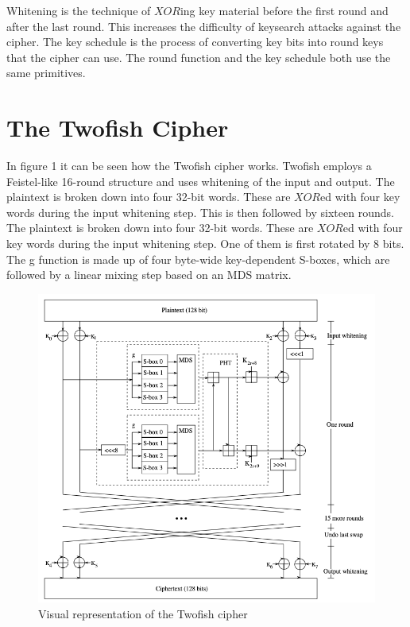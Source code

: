 \documentclass[11pt]{article}
\begin{document}
Whitening is the technique of \(XOR\)ing key material before the first round and after the last round. This increases the
difficulty of keysearch attacks against the cipher. The key schedule is the process of converting key bits into round keys that the cipher can use. The round function and the key schedule both use the same primitives.

\section{The Twofish Cipher}
In figure 1 it can be seen how the Twofish cipher works. Twofish employs a Feistel-like 16-round structure and uses whitening of the input and output. The plaintext is broken down into four 32-bit words. These are \(XOR\)ed with four key words during the input whitening step. This is then followed by sixteen rounds. The plaintext is broken down into four 32-bit words. These are \(XOR\)ed with four key words during the input whitening step. One of them is first rotated by 8 bits. The g function is made up of four byte-wide key-dependent S-boxes, which are followed by a linear mixing step based on an MDS matrix.

\begin{figure}[t]
\includegraphics[width=\textwidth]{images/twofish}
\caption{Visual representation of the Twofish cipher \cite{schneier1999twofish}}
\end{figure}
\end{document}

